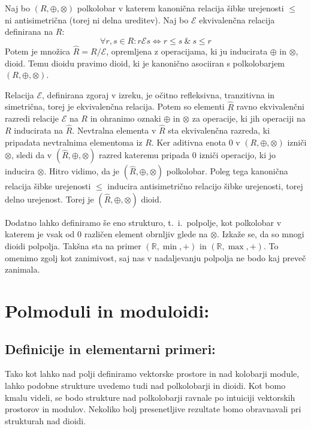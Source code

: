 \documentclass[mat1]{fmfdelo}
\newcommand{\R}{\mathbb{R}}
\begin{document}
\begin{izrek}
	Naj bo $(R, \oplus, \otimes)$ polkolobar v katerem kanonična relacija šibke urejenosti  $\leq$ ni antisimetrična (torej ni delna ureditev). Naj bo $\mathcal{E}$ ekvivalenčna relacija definirana na $R$:
$$\forall r, s\in R: r\mathcal{E}s \iff r\leq s ~\&~ s \leq r$$
	Potem je množica $\widehat{R} = R / \mathcal{E}$, opremljena z operacijama, ki ju inducirata $\oplus$ in $\otimes$, dioid. Temu dioidu pravimo dioid, ki je kanonično asociiran s polkolobarjem $(R, \oplus, \otimes)$.
\end{izrek}
\begin{dokaz}
	Relacija $\mathcal{E}$, definirana zgoraj v izreku, je očitno refleksivna, tranzitivna in simetrična, torej je ekvivalenčna relacija. Potem so elementi $\widehat{R}$ ravno ekvivalenčni razredi relacije $\mathcal{E}$ na $R$ in ohranimo oznaki $\oplus$ in $\otimes$ za operacije, ki jih operaciji na $R$ inducirata na $\widehat{R}$. Nevtralna elementa v $\widehat{R}$ sta ekvivalenčna razreda, ki pripadata nevtralnima elementoma iz $R$. Ker aditivna enota $0$ v $(R, \oplus, \otimes)$ izniči $\otimes$, sledi da v $(\widehat{R}, \oplus, \otimes)$ razred kateremu pripada $0$ izniči operacijo, ki jo inducira $\otimes$. Hitro vidimo, da je $(\widehat{R}, \oplus, \otimes)$ polkolobar. Poleg tega kanonična relacija šibke urejenosti $\leq$ inducira antisimetrično relacijo šibke urejenosti, torej delno urejenost. Torej je $(\widehat{R}, \oplus, \otimes)$ dioid.
\end{dokaz}
\begin{opomba}
	Dodatno lahko definiramo še eno strukturo, t.~i.~polpolje, kot polkolobar v katerem je vsak od $0$ različen element obrnljiv glede na $\otimes$. Izkaže se, da so mnogi dioidi polpolja. Takšna sta na primer $(\R, \min, +)$ in $(\R, \max, +)$. To omenimo zgolj kot zanimivost, saj nas v nadaljevanju polpolja ne bodo kaj preveč zanimala.
\end{opomba}

\section{Polmoduli in moduloidi:}
\subsection{Definicije in elementarni primeri:}
Tako kot lahko nad polji definiramo vektorske prostore in nad kolobarji module, lahko podobne strukture uvedemo tudi nad polkolobarji in dioidi. Kot bomo kmalu videli, se bodo strukture nad polkolobarji ravnale po intuiciji vektorskih prostorov in modulov. Nekoliko bolj presenetljive rezultate bomo obravnavali pri strukturah nad dioidi.
\end{document}
